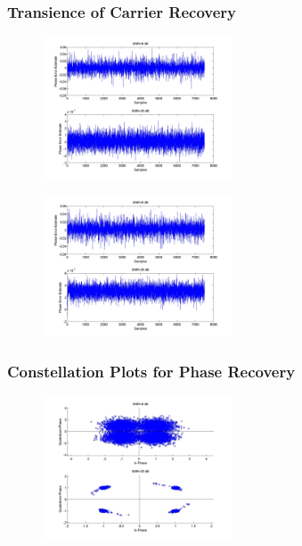 \documentclass[]{article}
\begin{document}
\subsubsection{Transience of Carrier Recovery}
\begin{figure}[H]
\centering
\hspace*{-2cm}\includegraphics[width=0.5\textwidth]{qpLoopFilterfo_costas1.jpg}
\caption{}
\end{figure}

\begin{figure}[H]
\centering
\hspace*{-2cm}\includegraphics[width=0.5\textwidth]{qpLoopFilterfo_costas2.jpg}
\caption{}
\end{figure}
\subsubsection{Constellation Plots  for Phase Recovery}
\begin{figure}[H]
\centering
\hspace*{-2cm}\includegraphics[width=0.5\textwidth]{qpConstpo_costas1.jpg}
\caption{}
\end{figure}
\end{document}
